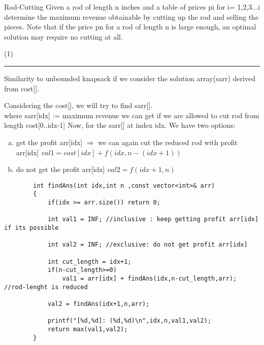 \begin{problem} {Rod-Cutting}
    Given a rod of length n inches and a
table of prices pi for i= 1,2,3...i determine the maximum revenue obtainable by cutting up the rod and selling the pieces. Note that if the price pn for a rod
of length n is large enough, an optimal solution may require no cutting at all.
\end{problem}


\begin{solution}
    (1)
    \vspace{3mm}
    \hrule
    
    \begin{intution}
        Similarity to unbounded knapsack if we consider the solution array(sarr) derived from cost[].
    \end{intution}

        
       Considering the cost[], we will try to find sarr[]. \\
       where sarr[idx] := maximum revenue we can get if we are allowed to cut rod from length cost[0..idx-1]
       Now, for the sarr[] at index idx.
       We have two options:
        \begin{enumerate}[(a)]
            \item get the profit arr[idx] $\Rightarrow$ we can again cut the reduced rod with profit arr[idx] $val1 = cost[idx] + f(idx,n-(idx+1))$
            \item do not get the profit arr[idx] $val2 = f(idx+1,n)$
        \end{enumerate}
    \begin{verbatim}
        int findAns(int idx,int n ,const vector<int>& arr)
        {
            if(idx >= arr.size()) return 0;
            
            int val1 = INF; //inclusive : keep getting profit arr[idx] if its possible
            
            int val2 = INF; //exclusive: do not get profit arr[idx]
            
            int cut_length = idx+1;
            if(n-cut_length>=0)
                val1 = arr[idx] + findAns(idx,n-cut_length,arr); //rod-lenght is reduced
                
            val2 = findAns(idx+1,n,arr); 
            
            printf("[%d,%d]: (%d,%d)\n",idx,n,val1,val2);
            return max(val1,val2);
        }
    \end{verbatim}
\end{solution}


